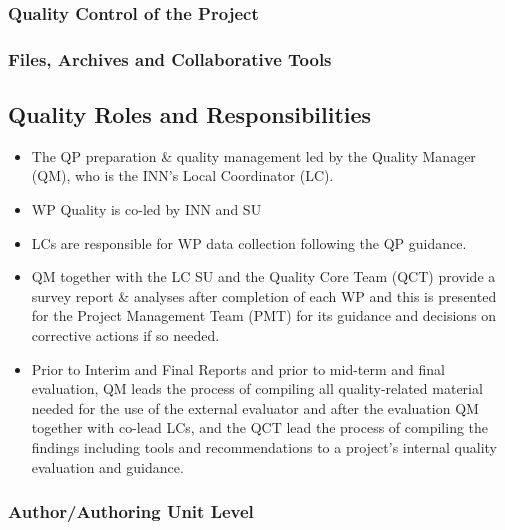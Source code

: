 \documentclass[
  11pt,
]{article}
\begin{document}
\hypertarget{quality-control-of-the-project}{%
\subsubsection{Quality Control of the
Project}\label{quality-control-of-the-project}}

\hypertarget{files-archives-and-collaborative-tools}{%
\subsubsection{Files, Archives and Collaborative
Tools}\label{files-archives-and-collaborative-tools}}

\hypertarget{quality-roles-and-responsibilities}{%
\subsection{Quality Roles and
Responsibilities}\label{quality-roles-and-responsibilities}}

\begin{itemize}
\item
  The QP preparation \& quality management led by the Quality Manager
  (QM), who is the INN's Local Coordinator (LC).
\item
  WP Quality is co-led by INN and SU
\item
  LCs are responsible for WP data collection following the QP guidance.
\item
  QM together with the LC SU and the Quality Core Team (QCT) provide a
  survey report \& analyses after completion of each WP and this is
  presented for the Project Management Team (PMT) for its guidance and
  decisions on corrective actions if so needed.
\item
  Prior to Interim and Final Reports and prior to mid-term and final
  evaluation, QM leads the process of compiling all quality-related
  material needed for the use of the external evaluator and after the
  evaluation QM together with co-lead LCs, and the QCT lead the process
  of compiling the findings including tools and recommendations to a
  project's internal quality evaluation and guidance.
\end{itemize}

\hypertarget{authorauthoring-unit-level}{%
\subsubsection{Author/Authoring Unit
Level}\label{authorauthoring-unit-level}}
\end{document}
